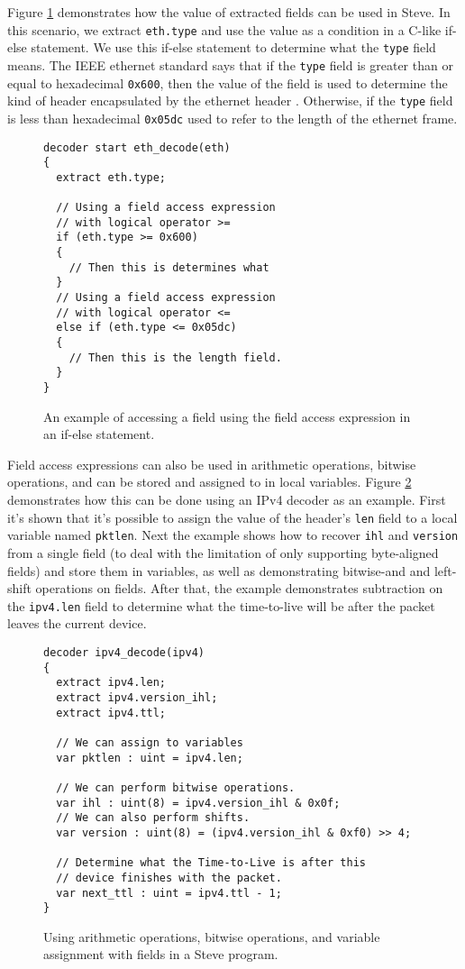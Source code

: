 Figure \ref{fg:access_ex} demonstrates how the value of extracted fields can be used in Steve. In this scenario, we extract \texttt{eth.type} and use the value as a condition in a C-like if-else statement. We use this if-else statement to determine what the \texttt{type} field means. The IEEE ethernet standard says that if the \texttt{type} field is greater than or equal to hexadecimal \texttt{0x600}, then the value of the field is used to determine the kind of header encapsulated by the ethernet header \cite{eth_std}. Otherwise, if the \texttt{type} field is less than hexadecimal \texttt{0x05dc} used to refer to the length of the ethernet frame.

\begin{figure}
\begin{lstlisting}
decoder start eth_decode(eth)
{
  extract eth.type;
  
  // Using a field access expression 
  // with logical operator >=
  if (eth.type >= 0x600)
  {
    // Then this is determines what 
  }
  // Using a field access expression 
  // with logical operator <=
  else if (eth.type <= 0x05dc)
  {
    // Then this is the length field.
  }
}
\end{lstlisting}
\caption{An example of accessing a field using the field access expression in an if-else statement.}
\label{fg:access_ex}
\end{figure}

Field access expressions can also be used in arithmetic operations, bitwise operations, and can be stored and assigned to in local variables. Figure \ref{fg:assign_arith_ex} demonstrates how this can be done using an IPv4 decoder as an example. First it's shown that it's possible to assign the value of the header's \texttt{len} field to a local variable named \texttt{pktlen}. Next the example shows how to recover \texttt{ihl} and \texttt{version} from a single field (to deal with the limitation of only supporting byte-aligned fields) and store them in variables, as well as demonstrating bitwise-and and left-shift operations on fields. After that, the example demonstrates subtraction on the \texttt{ipv4.len} field to determine what the time-to-live will be after the packet leaves the current device.

\begin{figure}
\begin{lstlisting}
decoder ipv4_decode(ipv4)
{
  extract ipv4.len;
  extract ipv4.version_ihl;
  extract ipv4.ttl;
  
  // We can assign to variables
  var pktlen : uint = ipv4.len;
  
  // We can perform bitwise operations.
  var ihl : uint(8) = ipv4.version_ihl & 0x0f;
  // We can also perform shifts.
  var version : uint(8) = (ipv4.version_ihl & 0xf0) >> 4;
  
  // Determine what the Time-to-Live is after this
  // device finishes with the packet.
  var next_ttl : uint = ipv4.ttl - 1;
}
\end{lstlisting}
\caption{Using arithmetic operations, bitwise operations, and variable assignment with fields in a Steve program.}
\label{fg:assign_arith_ex}
\end{figure}

